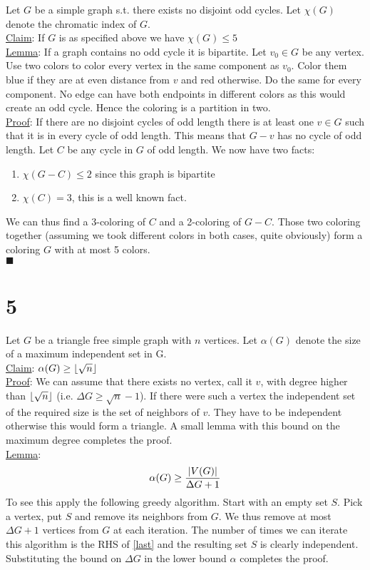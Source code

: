 \documentclass{article}
\DeclarePairedDelimiter{\abs}{\lvert}{\rvert}
\DeclarePairedDelimiter\floor{\lfloor}{\rfloor}
\begin{document}
	Let $G$ be a simple graph s.t. there exists no disjoint odd cycles. Let $\chi(G)$ denote the chromatic index of $G$. \\
	\underline{Claim}: If $G$ is as specified above we have $\chi(G) \leq 5$\\
	\underline{Lemma}: If a graph contains no odd cycle it is bipartite. Let $v_0 \in G$ be any vertex. Use two colors to color every vertex in the same component as $v_0$. Color them blue if they are at even distance from $v$ and red otherwise. Do the same for every component. No edge can have both endpoints in different colors as this would create an odd cycle. Hence the coloring is a partition in two.\\
	\underline{Proof}: If there are no disjoint cycles of odd length there is at least one $v \in G$ such that it is in every cycle of odd length. This means that $G - v$ has no cycle of odd length. Let $C$ be any cycle in $G$ of odd length. We now have two facts:
	\begin{enumerate}
		\item $\chi(G-C) \leq 2$ since this graph is bipartite\\
		\item $\chi(C) = 3$, this is a well known fact.
	\end{enumerate}
	We can thus find a 3-coloring of $C$ and a 2-coloring of $G-C$. Those two coloring together (assuming we took different colors in both cases, quite obviously) form a coloring $G$ with at most 5 colors.\\
	$\blacksquare$ 
	
	\clearpage
	
	\section*{5}
	
	Let $G$ be a triangle free simple graph with $n$ vertices. Let $\alpha(G)$ denote the size of a maximum independent set in G.\\
	\underline{Claim}: 
	$\alpha(G) \geq \floor{\sqrt{n}}$\\
	\underline{Proof}: We can assume that there exists no vertex, call it $v$, with degree higher than $\floor{\sqrt{n}}$ (i.e. $\Delta G \geq \sqrt{n} - 1 $). If there were such a vertex the independent set of the required size is the set of neighbors of $v$. They have to be independent otherwise this would form a triangle. A small lemma with this bound on the maximum degree completes the proof.\\
	\underline{Lemma}: 
	\begin{equation}\label{last}
		\alpha(G) \geq \frac{\abs{V(G)}}{\Delta G +1}
	\end{equation}
	To see this apply the following greedy algorithm. Start with an empty set $S$. Pick a vertex, put $S$ and remove its neighbors from $G$. We thus remove at most $\Delta G + 1$ vertices from $G$ at each iteration. The number of times we can iterate this algorithm is the RHS of \ref{last} and the resulting set $S$ is clearly independent. Substituting the bound on $\Delta G$ in the lower bound $\alpha$ completes the proof.
	
	
	
	

	
	
	
	
	
\end{document}
